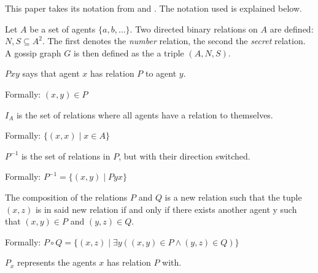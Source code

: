 This paper takes its notation from \Textcite{van_ditmarsch_dynamic_2018} and \Textcite{van_ditmarsch_strengthening_2019}.
The notation used is explained below.

\begin{definition}
    Let \(A\) be a set of agents \(\{a, b, \dots\}\).
    Two directed binary relations on \(A\) are defined: \(N, S \subseteq A^2\).
    The first denotes the \textit{number} relation, the second the \textit{secret} relation.
    A gossip graph \(G\) is then defined as the a triple \((A, N, S)\).
\end{definition}

\begin{definition}
    
\begin{subdefinition}
    \(Pxy\) says that agent \(x\) has relation \(P\) to agent \(y\).
    
    Formally: \((x, y) \in P\)
    \label{def:rel-bin}
\end{subdefinition}

\begin{subdefinition}
    \(I_A\) is the set of relations where all agents have a relation to themselves.
    
    Formally: \(\{(x,x) \mid x \in A\}\)
    \label{def:rel-id}
\end{subdefinition}

\begin{subdefinition}
    \(P^{-1}\) is the set of relations in \(P\), but with their direction switched.

    Formally: \(P^{-1} = \{(x,y) \mid Pyx\}\)
    \label{def:rel-conv}
\end{subdefinition}

\begin{subdefinition}
    The composition of the relations \(P\) and \(Q\) is a new relation such that the tuple \((x,z)\) is in said new relation if and only if there exists another agent y such that \((x,y) \in P\) and \((y,z) \in Q\).

    Formally: \(P \circ Q = \{(x,z) \mid \exists y ((x, y) \in P \land (y, z) \in Q) \}\)
    \label{def:rel-comp}
\end{subdefinition}

\begin{subdefinition}
    \(P_x\) represents the agents \(x\) has relation \(P\) with.


\end{subdefinition}
\end{definition}
